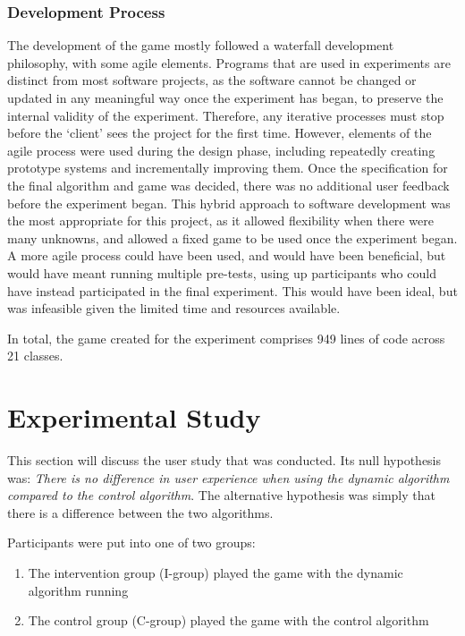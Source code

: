 \documentclass[12pt,a4paper]{article}\usepackage[]{graphicx}\usepackage[]{color}
\begin{document}
\subsubsection{Development Process}
The development of the game mostly followed a waterfall development philosophy, with some agile elements.
Programs that are used in experiments are distinct from most software projects, as the software cannot be changed or updated in any meaningful way once the experiment has began, to preserve the internal validity of the experiment.
Therefore, any iterative processes must stop before the `client' sees the project for the first time.
However, elements of the agile process were used during the design phase, including repeatedly creating prototype systems and incrementally improving them.
Once the specification for the final algorithm and game was decided, there was no additional user feedback before the experiment began.
This hybrid approach to software development was the most appropriate for this project, as it allowed flexibility when there were many unknowns, and allowed a fixed game to be used once the experiment began.
A more agile process could have been used, and would have been beneficial, but would have meant running multiple pre-tests, using up participants who could have instead participated in the final experiment.
This would have been ideal, but was infeasible given the limited time and resources available.

In total, the game created for the experiment comprises 949 lines of code across 21 classes.

\section{Experimental Study}

This section will discuss the user study that was conducted.
Its null hypothesis was: \emph{There is no difference in user experience when using the dynamic algorithm compared to the control algorithm}.
The alternative hypothesis was simply that there is a difference between the two algorithms.

Participants were put into one of two groups:
\begin{enumerate}
	\item The intervention group (I-group) played the game with the dynamic algorithm running
	\item The control group (C-group) played the game with the control algorithm
\end{enumerate}
\end{document}
